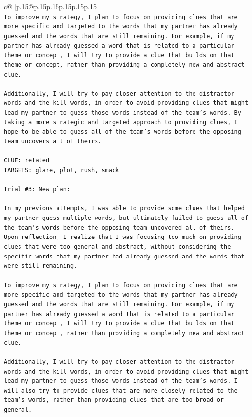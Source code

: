 \documentclass{article}
\begin{document}
{\begin{supertabular}{c@{$\;$}|p{.15\linewidth}@{}p{.15\linewidth}p{.15\linewidth}p{.15\linewidth}p{.15\linewidth}p{.15\linewidth}}
{{{\\ 
\texttt{To improve my strategy, I plan to focus on providing clues that are more specific and targeted to the words that my partner has already guessed and the words that are still remaining. For example, if my partner has already guessed a word that is related to a particular theme or concept, I will try to provide a clue that builds on that theme or concept, rather than providing a completely new and abstract clue.} \\
\\ 
\texttt{Additionally, I will try to pay closer attention to the distractor words and the kill words, in order to avoid providing clues that might lead my partner to guess those words instead of the team's words. By taking a more strategic and targeted approach to providing clues, I hope to be able to guess all of the team's words before the opposing team uncovers all of theirs.} \\
\\ 
\texttt{CLUE: related} \\
\texttt{TARGETS: glare, plot, rush, smack} \\
\\ 
\texttt{Trial \#3: New plan: } \\
\\ 
\texttt{In my previous attempts, I was able to provide some clues that helped my partner guess multiple words, but ultimately failed to guess all of the team's words before the opposing team uncovered all of theirs. Upon reflection, I realize that I was focusing too much on providing clues that were too general and abstract, without considering the specific words that my partner had already guessed and the words that were still remaining.} \\
\\ 
\texttt{To improve my strategy, I plan to focus on providing clues that are more specific and targeted to the words that my partner has already guessed and the words that are still remaining. For example, if my partner has already guessed a word that is related to a particular theme or concept, I will try to provide a clue that builds on that theme or concept, rather than providing a completely new and abstract clue.} \\
\\ 
\texttt{Additionally, I will try to pay closer attention to the distractor words and the kill words, in order to avoid providing clues that might lead my partner to guess those words instead of the team's words. I will also try to provide clues that are more closely related to the team's words, rather than providing clues that are too broad or general.} \\
}}}
\end{supertabular}}
\end{document}
